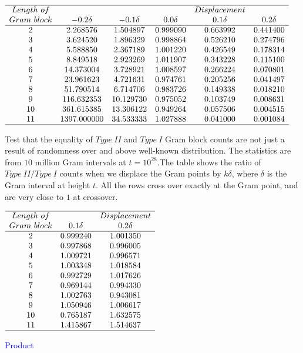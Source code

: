 \documentclass[twoside]{article}
\theoremstyle{definition}
\begin{document}
\begin{table}
\centering \(\begin{array}{cccccc}
\hline
Length~of 	& &&&Displacement \\
Gram~block	& -0.2\delta & -0.1\delta & 0.0\delta & 0.1\delta & 0.2\delta  \\
\hline
2 &2.268576&1.504897&0.999090&0.663992&0.441400 \\
3 &3.624520&1.896329&0.998864&0.526210&0.274796 \\
4 &5.588850&2.367189&1.001220&0.426549&0.178314 \\
5 &8.849518&2.923269&1.011907&0.343228&0.115100 \\
6 &14.373004&3.728921&1.008597&0.266224&0.070801 \\
7 &23.961623&4.721631&0.974761&0.205256&0.041497 \\
8 &51.790514&6.714706&0.983726&0.149338&0.018210 \\
9 &116.632353&10.129730&0.975052&0.103749&0.008631 \\
10 &361.615385&13.306122&0.949264&0.057506&0.004515 \\
11 &1397.000000&34.533333&1.027888&0.041000&0.001084 \\
\hline
\end{array}\)
\caption{Test that the equality of $Type~II$ and $Type~I$ Gram block counts are not just a result of randomness over and above well-known distribution. The statistics are from $10$ million Gram intervals at $t=10^{28}$.The table shows the ratio of $Type~II/Type~I$ counts when we displace the Gram points by $k\delta$, where $\delta$ is the Gram interval at height $t$. All the rows cross over exactly at the Gram point, and are very close to $1$ at crossover. }
\label{tab:rosserrandom}
\end{table}

\begin{table}
\centering \(\begin{array}{ccc}
\hline
Length~of 	& &Displacement \\
Gram~block	 & 0.1\delta & 0.2\delta  \\
\hline
2 &0.999240&1.001350 \\
3 &0.997868&0.996005 \\
4 &1.009721&0.996571 \\
5 &1.003348&1.018584 \\
6 &0.992729&1.017626 \\
7 &0.969144&0.994330 \\
8 &1.002763&0.943081 \\
9 &1.050946&1.006617 \\
10 &0.765187&1.632575 \\
11 &1.415867&1.514637 \\
\hline
\end{array}\)
\caption{ \textcolor{blue}{Product}}
\label{tab:rosserproduct}
\end{table}
\end{document}

